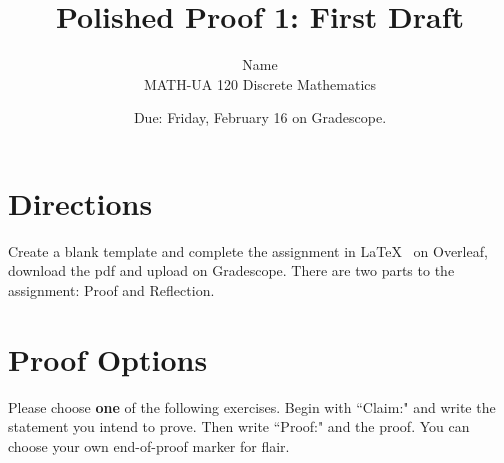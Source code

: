 \documentclass{article}
\title{Polished Proof 1: First Draft}
\author{%
	Name
	\\
	MATH-UA 120 Discrete Mathematics
}
\date{Due: Friday, February 16 on Gradescope.}
\theoremstyle{definition}
\begin{document}
    \maketitle
	
\section*{Directions}
    Create a blank template and complete the assignment in \LaTeX~  on Overleaf, 
    download the pdf and upload on Gradescope. There are two parts to the assignment: Proof and Reflection.

\section*{Proof Options}
    Please choose \textbf{one} of the following exercises. Begin with ``Claim:" and write the statement you intend to prove. 
    Then write ``Proof:" and the proof. You can choose your own end-of-proof marker for flair.
\end{document}
